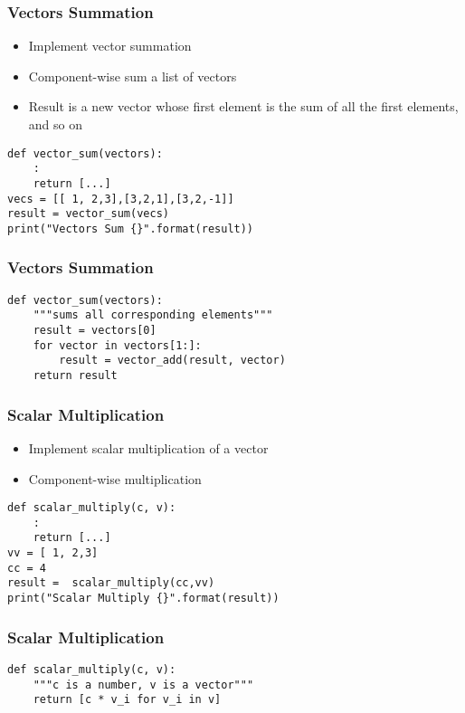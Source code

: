 \begin{frame}[fragile]\frametitle{Vectors Summation}
\begin{itemize}
\item Implement vector summation
\item Component-wise sum a list of vectors
\item Result is a new vector whose first element is the sum of all the first elements, and so on
\end{itemize}
\begin{lstlisting}
def vector_sum(vectors):
	:
	return [...]
vecs = [[ 1, 2,3],[3,2,1],[3,2,-1]]
result = vector_sum(vecs)
print("Vectors Sum {}".format(result))
\end{lstlisting}
\end{frame}

\begin{frame}[fragile]\frametitle{Vectors Summation}
\begin{lstlisting}
def vector_sum(vectors):
    """sums all corresponding elements"""
    result = vectors[0]
    for vector in vectors[1:]:     
        result = vector_add(result, vector)    
    return result
\end{lstlisting}
\end{frame}

\begin{frame}[fragile]\frametitle{Scalar Multiplication}
\begin{itemize}
\item Implement scalar multiplication of a vector
\item Component-wise multiplication
\end{itemize}
\begin{lstlisting}
def scalar_multiply(c, v):
	:
	return [...]
vv = [ 1, 2,3]
cc = 4
result =  scalar_multiply(cc,vv)
print("Scalar Multiply {}".format(result))
\end{lstlisting}
\end{frame}

\begin{frame}[fragile]\frametitle{Scalar Multiplication}
\begin{lstlisting}
def scalar_multiply(c, v):
    """c is a number, v is a vector"""
    return [c * v_i for v_i in v]
\end{lstlisting}
\end{frame}


